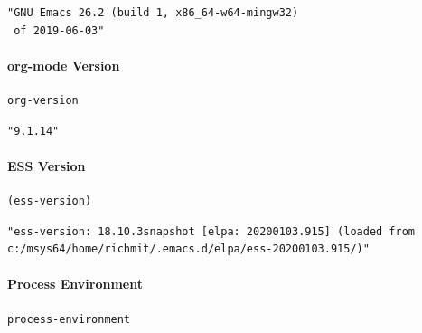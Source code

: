 \documentclass[11pt]{article}
\begin{document}
\begin{verbatim}
"GNU Emacs 26.2 (build 1, x86_64-w64-mingw32)
 of 2019-06-03"
\end{verbatim}

\paragraph{org-mode Version}
\label{sec:org2325591}

\begin{verbatim}
org-version
\end{verbatim}

\begin{verbatim}
"9.1.14"
\end{verbatim}

\paragraph{ESS Version}
\label{sec:org1906236}

\begin{verbatim}
(ess-version)
\end{verbatim}

\begin{verbatim}
"ess-version: 18.10.3snapshot [elpa: 20200103.915] (loaded from c:/msys64/home/richmit/.emacs.d/elpa/ess-20200103.915/)"
\end{verbatim}

\paragraph{Process Environment}
\label{sec:orgd9c2f02}

\begin{verbatim}
process-environment
\end{verbatim}
\end{document}
